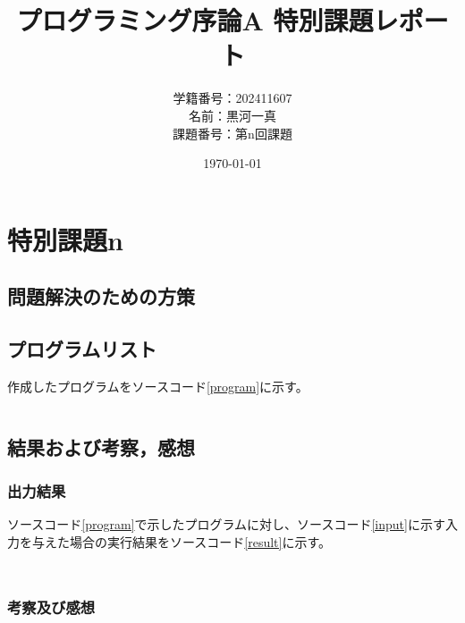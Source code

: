 \documentclass[a4paper]{ltjsarticle}
\title{プログラミング序論A 特別課題レポート}
\author{学籍番号：202411607\\名前：黒河一真\\課題番号：第n回課題}
\date{\today}
\begin{document}
\maketitle

\section{特別課題n}

\subsection{問題解決のための方策}

\subsection{プログラムリスト}
作成したプログラムをソースコード\ref{program}に示す。
\begin{lstlisting}[caption=特別課題nのプログラム,label=program]

\end{lstlisting}
\subsection{結果および考察，感想}
\subsubsection{出力結果}
ソースコード\ref{program}で示したプログラムに対し、ソースコード\ref{input}に示す入力を与えた場合の実行結果をソースコード\ref{result}に示す。
\begin{lstlisting}[caption=特別課題nのプログラムに対する入力,label=input]

\end{lstlisting}
\begin{lstlisting}[caption=特別課題nのプログラムの実行結果,label=result]

\end{lstlisting}
\subsubsection{考察及び感想}
\end{document}
